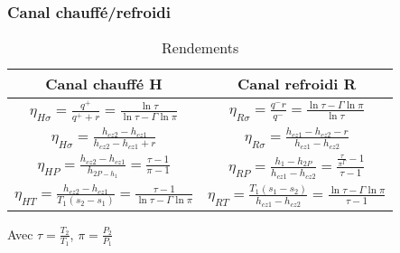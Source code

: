 \documentclass[../main.tex]{subfiles}
\begin{document}
\subsubsection{Canal chauffé/refroidi}
\begin{table}[hbt!]
    \centering
    \begin{tabular}{c|c}
        Canal chauffé H & Canal refroidi R  \\
        \hline
        $\eta_{H\sigma} = \frac{q^+}{q^+ + r} = \frac{\ln{\tau}}{\ln{\tau} - \Gamma \ln{\pi}}$ & $\eta_{R\sigma} = \frac{q^- r}{q^-} = \frac{\ln{\tau} - \Gamma \ln{\pi}}{\ln{\tau}}$ \\
        $\eta_{H\sigma} = \frac{h_{cz2} - h_{cz1}}{h_{cz2} - h_{cz1} + r}$ & $\eta_{R\sigma} = \frac{h_{cz1} - h_{cz2} - r}{h_{cz1} - h_{cz2}}$\\
        \hline
        $\eta_{HP} = \frac{h_{cz2} - h_{cz1}}{h_{2P-h_1}} = \frac{\tau -1}{\pi -1}$ & $\eta_{RP} = \frac{h_1-h_{2P}}{h_{cz1} - h_{cz2}} = \frac{\frac{\tau}{\pi^{\Gamma}}-1}{\tau-1}$\\
        \hline
        $\eta_{HT} = \frac{h_{cz2} - h_{cz1}}{T_1(s_2-s_1)} = \frac{\tau-1}{\ln{\tau}-\Gamma \ln{\pi}}$ & $\eta_{RT} = \frac{T_1(s_1-s_2)}{h_{cz1} - h_{cz2}} = \frac{\ln{\tau}-\Gamma \ln{\pi}}{\tau -1}$
    \end{tabular}
    \caption{Rendements}
\end{table}

Avec $\tau = \frac{T_2}{T_1}$, $\pi = \frac{P_2}{P_1}$\\
\end{document}
